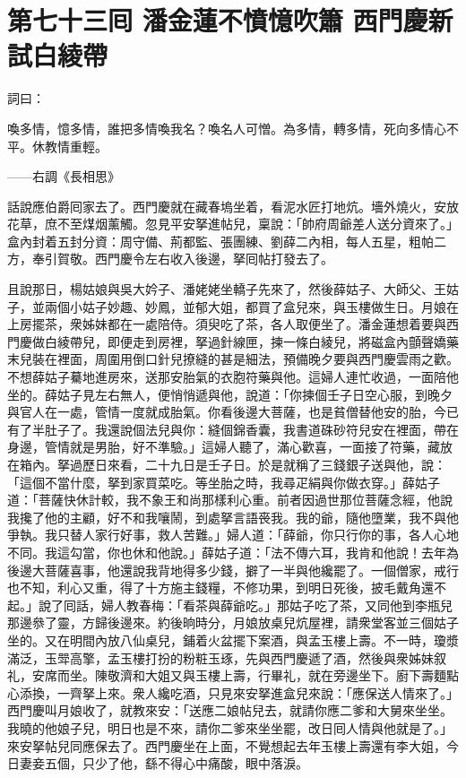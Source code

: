 
\chapter*{第七十三囘 潘金蓮不憤憶吹簫 西門慶新試白綾帶}


詞曰：

喚多情，憶多情，誰把多情喚我名？喚名人可憎。為多情，轉多情，死向多情心不平。休教情重輕。

——右調《長相思》

話說應伯爵囘家去了。西門慶就在藏春塢坐着，看泥水匠打地炕。墻外燒火，安放花草，庶不至煤烟薰觸。忽見平安拏進帖兒，稟說：「帥府周爺差人送分資來了。」盒內封着五封分資：周守備、荊都監、張團練、劉薛二內相，每人五星，粗帕二方，奉引賀敬。西門慶令左右收入後邊，拏囘帖打發去了。

且說那日，楊姑娘與吳大妗子、潘姥姥坐轎子先來了，然後薛姑子、大師父、王姑子，並兩個小姑子妙趣、妙鳳，並郁大姐，都買了盒兒來，與玉樓做生日。月娘在上房擺茶，衆姊妹都在一處陪侍。須臾吃了茶，各人取便坐了。潘金蓮想着要與西門慶做白綾帶兒，即便走到房裡，拏過針線匣，揀一條白綾兒，將磁盒內顫聲嬌藥末兒裝在裡面，周圍用倒口針兒撩縫的甚是細法，預備晚夕要與西門慶雲雨之歡。不想薛姑子驀地進房來，送那安胎氣的衣胞符藥與他。這婦人連忙收過，一面陪他坐的。薛姑子見左右無人，便悄悄遞與他，{}說道：「你揀個壬子日空心服，到晚夕與官人在一處，管情一度就成胎氣。你看後邊大菩薩，也是貧僧替他安的胎，今已有了半肚子了。我還說個法兒與你：縫個錦香囊，我書道硃砂符兒安在裡面，帶在身邊，管情就是男胎，好不準驗。」{}這婦人聽了，滿心歡喜，一面接了符藥，藏放在箱內。拏過歷日來看，二十九日是壬子日。於是就稱了三錢銀子送與他，說：「這個不當什麼，拏到家買菜吃。等坐胎之時，我尋疋絹與你做衣穿。」薛姑子道：「菩薩快休計較，我不象王和尚那樣利心重。{}前者因過世那位菩薩念經，他說我攙了他的主顧，好不和我嚷鬧，到處拏言語䘮我。我的爺，隨他墮業，我不與他爭執。我只替人家行好事，救人苦難。」婦人道：「薛爺，你只行你的事，各人心地不同。我這勾當，你也休和他說。」薛姑子道：「法不傳六耳，我肯和他說！去年為後邊大菩薩喜事，他還說我背地得多少錢，擗了一半與他纔罷了。一個僧家，戒行也不知，利心又重，得了十方施主錢糧，不修功果，到明日死後，披毛戴角還不起。」說了囘話，婦人教春梅：「看茶與薛爺吃。」那姑子吃了茶，又同他到李瓶兒那邊叅了靈，方歸後邊來。約後晌時分，月娘放桌兒炕屋裡，請衆堂客並三個姑子坐的。又在明間內放八仙桌兒，鋪着火盆擺下案酒，與孟玉樓上壽。不一時，瓊漿滿泛，玉斝高擎，孟玉樓打扮的粉粧玉琢，先與西門慶遞了酒，然後與衆姊妹叙礼，安席而坐。陳敬濟和大姐又與玉樓上壽，行畢礼，就在旁邊坐下。廚下壽麵點心添換，一齊拏上來。衆人纔吃酒，只見來安拏進盒兒來說：「應保送人情來了。」西門慶叫月娘收了，就教來安：「送應二娘帖兒去，就請你應二爹和大舅來坐坐。我曉的他娘子兒，明日也是不來，請你二爹來坐坐罷，改日囘人情與他就是了。」來安拏帖兒同應保去了。西門慶坐在上面，不覺想起去年玉樓上壽還有李大姐，今日妻妾五個，只少了他，繇不得心中痛酸，眼中落淚。{}

